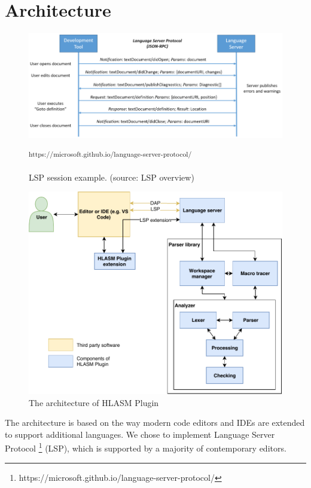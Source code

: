 \chapter{Architecture}

\begin{figure}
	\centering
	\includegraphics[width=\textwidth]{img/language-server-sequence}
	\caption[LSP session example.]{LSP session example. (source: LSP overview)}
	\label{fig04:LSP}
	\small\textsuperscript{https://microsoft.github.io/language-server-protocol/}
\end{figure}

\begin{figure}
	\centering
	\includegraphics[width=\textwidth]{img/hlasm_architecture}
	\caption{The architecture of HLASM Plugin}
	\label{fig04:arch}
\end{figure}

The architecture is based on the way modern code editors and IDEs are extended to support additional languages. We chose to implement Language Server Protocol \footnote{\label{note1}https://microsoft.github.io/language-server-protocol/} (LSP), which is supported by a majority of contemporary editors.

